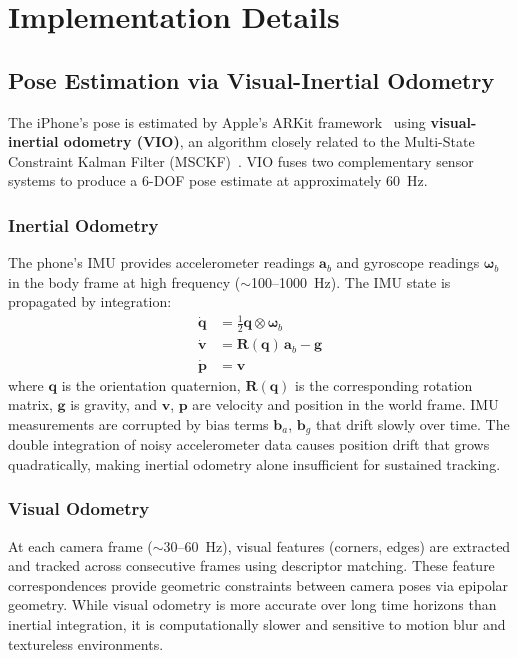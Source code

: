 \section{Implementation Details}

\subsection{Pose Estimation via Visual-Inertial Odometry}

The iPhone's pose is estimated by Apple's ARKit framework~\cite{apple_arkit} using \textbf{visual-inertial odometry (VIO)}, an algorithm closely related to the Multi-State Constraint Kalman Filter (MSCKF)~\cite{mourikis2007, li2013}. VIO fuses two complementary sensor systems to produce a 6-DOF pose estimate at approximately 60~Hz.

\subsubsection{Inertial Odometry}

The phone's IMU provides accelerometer readings $\mathbf{a}_b$ and gyroscope readings $\boldsymbol{\omega}_b$ in the body frame at high frequency ($\sim$100--1000~Hz). The IMU state is propagated by integration:
\begin{align}
    \dot{\mathbf{q}} &= \frac{1}{2} \mathbf{q} \otimes \boldsymbol{\omega}_b \label{eq:imu_orient} \\
    \dot{\mathbf{v}} &= \mathbf{R}(\mathbf{q})\,\mathbf{a}_b - \mathbf{g} \label{eq:imu_vel} \\
    \dot{\mathbf{p}} &= \mathbf{v} \label{eq:imu_pos}
\end{align}
where $\mathbf{q}$ is the orientation quaternion, $\mathbf{R}(\mathbf{q})$ is the corresponding rotation matrix, $\mathbf{g}$ is gravity, and $\mathbf{v}$, $\mathbf{p}$ are velocity and position in the world frame. IMU measurements are corrupted by bias terms $\mathbf{b}_a$, $\mathbf{b}_g$ that drift slowly over time. The double integration of noisy accelerometer data causes position drift that grows quadratically, making inertial odometry alone insufficient for sustained tracking.

\subsubsection{Visual Odometry}

At each camera frame ($\sim$30--60~Hz), visual features (corners, edges) are extracted and tracked across consecutive frames using descriptor matching. These feature correspondences provide geometric constraints between camera poses via epipolar geometry. While visual odometry is more accurate over long time horizons than inertial integration, it is computationally slower and sensitive to motion blur and textureless environments.

